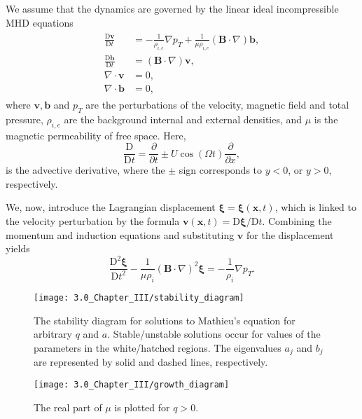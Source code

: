 \documentclass[12pt]{ociamthesis}
\begin{document}
We assume that the dynamics are governed by the linear ideal incompressible MHD equations
\begin{align}
\begin{split}
\label{eq2}
\frac{\mathrm{D} \mathbf{v}}{\mathrm{D} t}
& = - \frac{1}{\rho_{i, e}} \nabla p_T
+ \frac{1}{\mu \rho_{i, e}}( \mathbf{B} \cdot \nabla )\mathbf{b},
\\[0.3cm]
\frac{\mathrm{D} \mathbf{b}}{\mathrm{D} t}
& = ( \mathbf{B} \cdot \nabla ) \mathbf{v},
\\[0.3cm]
\nabla \cdot \mathbf{v} & = 0,
\\[0.3cm]
\nabla \cdot \mathbf{b} & = 0,
\end{split}
\end{align}
where $\mathbf v, \mathbf b$ and $p_T$ are the perturbations of the velocity, magnetic field and total pressure, $\rho_{i,e}$ are the background internal and external densities, and $\mu$ is the magnetic permeability of free space.
Here,
\[
\dfrac{\mathrm{D}}{\mathrm{D} t} = \dfrac{\partial}{\partial t} \pm U \cos(\Omega t) \dfrac{\partial}{\partial x},
\]
is the advective derivative, where the $\pm$ sign corresponds to $y < 0$, or $y > 0$, respectively.

We, now, introduce the Lagrangian displacement $\bm \xi = \bm \xi(\mathbf{x}, t)$, which is linked to the velocity perturbation by the formula $\mathbf v (\mathbf{x}, t) = \mathrm{D} \bm \xi / \mathrm{D} t$.
Combining the momentum and induction equations and substituting $\mathbf v$ for the displacement yields
\begin{equation}
\label{eq3}
\frac{\mathrm{D}^2 \bm \xi}{\mathrm{D} t^2}
- \frac{1}{\mu \rho_i} ( \mathbf{B} \cdot \nabla )^2 \bm \xi
= - \frac{1}{\rho_i} \nabla p_T.
\end{equation}

\begin{figure}[t]
\centering
\texttt{[image: 3.0\_Chapter\_III/stability\_diagram]}
\caption{The stability diagram for solutions to Mathieu's equation for arbitrary $q$ and $a$.
Stable/unstable solutions occur for values of the parameters in the white/hatched regions.
The eigenvalues $a_j$ and $b_j$ are represented by solid and dashed lines, respectively.}
\label{stability_diagram}
\end{figure}

\begin{figure}[t]
\centering
\texttt{[image: 3.0\_Chapter\_III/growth\_diagram]}
\caption{The real part of $\mu$ is plotted for $q > 0$.}
\label{growth_diagram}
\end{figure}
\end{document}
